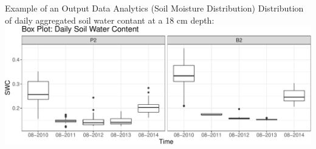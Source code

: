 \documentclass[
  ignorenonframetext,
]{beamer}
\begin{document}
\begin{frame}{Example of an Output Data Analytics (Soil Moisture
Distribution)}
\protect\hypertarget{example-of-an-output-data-analytics-soil-moisture-distribution}{}
Distribution of daily aggregated soil water contant at a 18 cm depth:
\includegraphics{presentation_files/figure-beamer/unnamed-chunk-15-1.pdf}
\end{frame}
\end{document}
